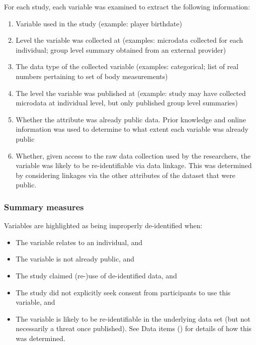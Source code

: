 For each study, each variable was examined to extract the following information:

\begin{enumerate}
\item Variable used in the study (example: player birthdate)
\item Level the variable was collected at (examples: microdata collected for each individual; group level summary obtained from an external provider)
\item The data type of the collected variable (examples: categorical; list of real numbers pertaining to set of body measurements)
\item The level the variable was published at (example: study may have collected microdata at individual level, but only published group level summaries)
\item Whether the attribute was already public data. Prior knowledge and online information was used to determine to what extent each variable was already public
\item Whether, given access to the raw data collection used by the researchers, the variable was likely to be re-identifiable via data linkage. This was determined by considering linkages via the other attributes of the dataset that were public.
\end{enumerate}


\subsubsection{Summary measures}
\label{sec:summary-measures}

Variables are highlighted as being improperly de-identified when:

\begin{itemize}
\item The variable relates to an individual, and
\item The variable is not already public, and
\item The study claimed (re-)use of de-identified data, and
\item The study did not explicitly seek consent from participants to use this variable, and
\item The variable is likely to be re-identifiable in the underlying data set (but not necessarily a threat once published). See Data items () for details of how this was determined.
\end{itemize}

